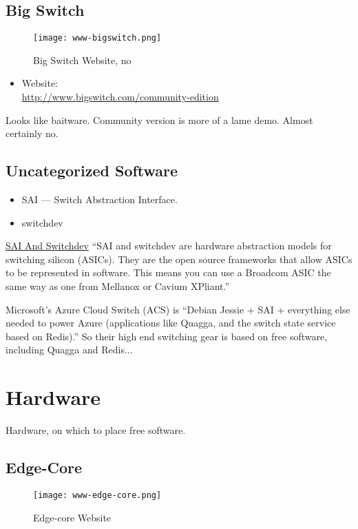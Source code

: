 \subsection{Big Switch}
\begin{figure}[h!]
\texttt{[image: www-bigswitch.png]}
 \caption{Big Switch Website, no}
 \label{fig:www-bigswitch}
\end{figure}


\begin{itemize}
 \item Website: \\ \url{http://www.bigswitch.com/community-edition}
\end{itemize}


Looks like baitware. Community version is more of a lame demo.
Almost certainly no.


\subsection{Uncategorized Software}
\begin{itemize}
 \item SAI --- Switch Abstraction Interface.
 \item switchdev
\end{itemize}


\href{http://packetpushers.net/sai-and-switchdev-need-to-succeed/}{SAI And Switchdev}
``SAI and switchdev are hardware abstraction models for switching silicon (ASICs). They are the open source frameworks that allow ASICs to be represented in software. This means you can use a Broadcom ASIC the same way as one from Mellanox or Cavium XPliant.''

Microsoft's Azure Cloud Switch (ACS) is ``Debian Jessie + SAI + everything else needed to power Azure (applications like Quagga, and the switch state service based on Redis).'' So their high end switching gear is based on free software, including Quagga and Redis...


\section{Hardware}
Hardware, on which to place free software.


\subsection{Edge-Core}
\begin{figure}[h!]
\texttt{[image: www-edge-core.png]}
 \caption{Edge-core Website}
 \label{fig:www-edge-core}
\end{figure}


